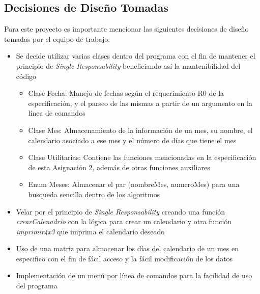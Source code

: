 \documentclass[10pt,journal,compsoc]{IEEEtran}
\begin{document}
\subsection{Decisiones de Diseño Tomadas}
	\par Para este proyecto es importante mencionar las siguientes decisiones de diseño tomadas por el equipo de trabajo:
	\begin{itemize}
		\item Se decide utilizar varias clases dentro del programa con el fin de mantener el principio de \textit{Single Responsability} beneficiando así la mantenibilidad del código
		\begin{itemize}
			\item Clase Fecha: Manejo de fechas según el requerimiento R0 de la especificación, y el parseo de las mismas a partir de un argumento en la línea de comandos
			\item Clase Mes: Almacenamiento de la información de un mes, su nombre, el calendario asociado a ese mes y el número de días que tiene el mes
			\item Clase Utilitarias: Contiene las funciones mencionadas en la especificación de esta Asignación 2, además de otras funciones auxiliares
			\item Enum Meses: Almacenar el par (nombreMes, numeroMes) para una busqueda sencilla dentro de los algoritmos
		\end{itemize}
		\item Velar por el principio de \textit{Single Responsability} creando una función \textit{crearCalenadrio} con la lógica para crear un calendario y otra función \textit{imprimir\textunderscore4x3} que imprima el calendario deseado
		\item Uso de una matriz para almacenar los días del calendario de un mes en especifico con el fin de fácil acceso y la fácil modificación de los datos 
		\item Implementación de un menú por línea de comandos para la facilidad de uso del programa
	\end{itemize}
\end{document}
